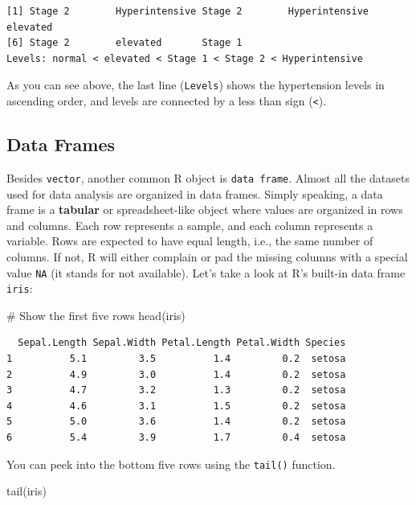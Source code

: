 \documentclass[
  letterpaper,
  DIV=11,
  numbers=noendperiod]{scrreprt}
\newenvironment{Shaded}{\begin{snugshade}}{\end{snugshade}}
\newcommand{\CommentTok}[1]{\textcolor[rgb]{0.37,0.37,0.37}{#1}}
\newcommand{\FunctionTok}[1]{\textcolor[rgb]{0.28,0.35,0.67}{#1}}
\newcommand{\NormalTok}[1]{\textcolor[rgb]{0.00,0.23,0.31}{#1}}
\begin{document}
\begin{verbatim}
[1] Stage 2        Hyperintensive Stage 2        Hyperintensive elevated      
[6] Stage 2        elevated       Stage 1       
Levels: normal < elevated < Stage 1 < Stage 2 < Hyperintensive
\end{verbatim}

As you can see above, the last line (\texttt{Levels}) shows the
hypertension levels in ascending order, and levels are connected by a
less than sign (\texttt{\textless{}}).

\subsection{Data Frames}\label{sec-01-data-frames}

Besides \texttt{vector}, another common R object is
\texttt{data\ frame}. Almost all the datasets used for data analysis are
organized in data frames. Simply speaking, a data frame is a
\textbf{tabular} or spreadsheet-like object where values are organized
in rows and columns. Each row represents a sample, and each column
represents a variable. Rows are expected to have equal length, i.e., the
same number of columns. If not, R will either complain or pad the
missing columns with a special value \texttt{NA} (it stands for not
available). Let's take a look at R's built-in data frame \texttt{iris}:

\begin{Shaded}
\begin{Highlighting}[]
\CommentTok{\# Show the first five rows}
\FunctionTok{head}\NormalTok{(iris)}
\end{Highlighting}
\end{Shaded}

\begin{verbatim}
  Sepal.Length Sepal.Width Petal.Length Petal.Width Species
1          5.1         3.5          1.4         0.2  setosa
2          4.9         3.0          1.4         0.2  setosa
3          4.7         3.2          1.3         0.2  setosa
4          4.6         3.1          1.5         0.2  setosa
5          5.0         3.6          1.4         0.2  setosa
6          5.4         3.9          1.7         0.4  setosa
\end{verbatim}

You can peek into the bottom five rows using the \texttt{tail()}
function.

\begin{Shaded}
\begin{Highlighting}[]
\FunctionTok{tail}\NormalTok{(iris)}
\end{Highlighting}
\end{Shaded}
\end{document}
